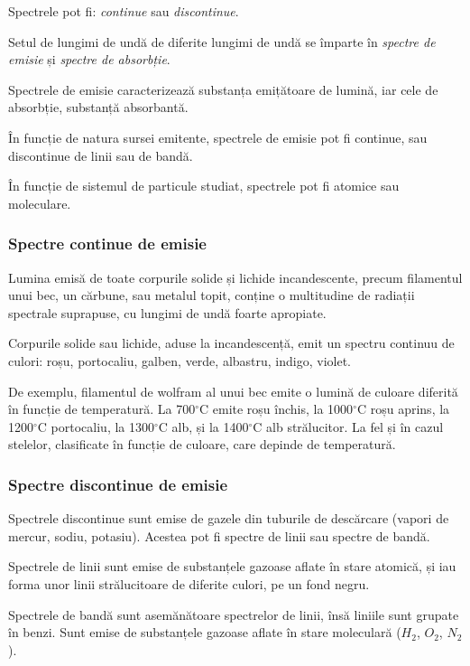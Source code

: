 Spectrele pot fi: \emph{continue} sau \emph{discontinue}.

Setul de lungimi de undă de diferite lungimi de undă se împarte în
\emph{spectre de emisie} și \emph{spectre de absorbție}.

Spectrele de emisie caracterizează substanța emițătoare de lumină, iar cele de
absorbție, substanță absorbantă.

În funcție de natura sursei emitente, spectrele de emisie pot fi continue, sau discontinue de linii sau de bandă.

În funcție de sistemul de particule studiat, spectrele pot fi atomice sau moleculare.

\subsubsection{Spectre continue de emisie}

Lumina emisă de toate corpurile solide și lichide incandescente, precum
filamentul unui bec, un cărbune, sau metalul topit, conține o multitudine de
radiații spectrale suprapuse, cu lungimi de undă foarte apropiate.

Corpurile solide sau lichide, aduse la incandescență, emit un spectru continuu de culori: roșu, portocaliu, galben, verde, albastru, indigo, violet.

De exemplu, filamentul de wolfram al unui bec emite o lumină de culoare
diferită în funcție de temperatură. La 700$^\circ$C emite roșu închis, la
1000$^\circ$C roșu aprins, la 1200$^\circ$C portocaliu, la 1300$^\circ$C alb,
și la 1400$^\circ$C alb strălucitor. La fel și în cazul stelelor, clasificate
în funcție de culoare, care depinde de temperatură.

\subsubsection{Spectre discontinue de emisie}

Spectrele discontinue sunt emise de gazele din tuburile de descărcare (vapori
de mercur, sodiu, potasiu). Acestea pot fi spectre de linii sau spectre de
bandă.

Spectrele de linii sunt emise de substanțele gazoase aflate în stare atomică,
și iau forma unor linii strălucitoare de diferite culori, pe un fond negru.

Spectrele de bandă sunt asemănătoare spectrelor de linii, însă liniile sunt
grupate în benzi. Sunt emise de substanțele gazoase aflate în stare moleculară
($H_2$, $O_2$, $N_2$).

